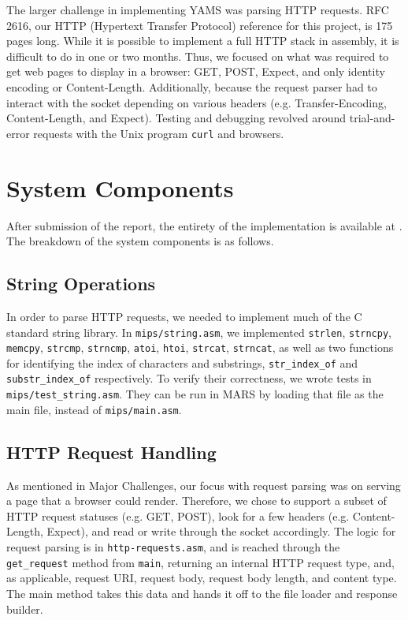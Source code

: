 \documentclass[journal,10pt]{IEEEtran}
\begin{document}
The larger challenge in implementing YAMS was parsing HTTP requests. RFC
2616\cite{Leach}, our HTTP (Hypertext Transfer Protocol) reference for this
project, is 175 pages long. While it is possible to implement a full HTTP stack
in assembly, it is difficult to do in one or two months. Thus, we focused on
what was required to get web pages to display in a browser: GET, POST, Expect,
and only identity encoding or Content-Length. Additionally, because the request
parser had to interact with the socket depending on various headers (e.g.
Transfer-Encoding, Content-Length, and Expect). Testing and debugging revolved
around trial-and-error requests with the Unix program \texttt{curl} and browsers.

\section{System Components}

After submission of the report, the entirety of the implementation is available at \cite{Brennan}. The breakdown of the system components is as follows.

\subsection{String Operations}

In order to parse HTTP requests, we needed to implement much of the C standard
string library.  In \texttt{mips/string.asm}, we implemented \texttt{strlen},
\texttt{strncpy}, \texttt{memcpy}, \texttt{strcmp}, \texttt{strncmp},
\texttt{atoi}, \texttt{htoi}, \texttt{strcat}, \texttt{strncat}, as well as two
functions for identifying the index of characters and substrings,
\texttt{str\_index\_of} and \texttt{substr\_index\_of} respectively.  To verify
their correctness, we wrote tests in \texttt{mips/test\_string.asm}.  They can
be run in MARS by loading that file as the main file, instead of
\texttt{mips/main.asm}.

\subsection{HTTP Request Handling}

As mentioned in Major Challenges, our focus with request parsing was on serving
a page that a browser could render. Therefore, we chose to support a subset of
HTTP request statuses (e.g. GET, POST), look for a few headers (e.g.
Content-Length, Expect), and read or write through the socket accordingly. The
logic for request parsing is in \texttt{http-requests.asm}, and is reached
through the \texttt{get\_request} method from \texttt{main}, returning an
internal HTTP request type, and, as applicable, request URI, request body,
request body length, and content type. The main method takes this data and
hands it off to the file loader and response builder.
\end{document}
